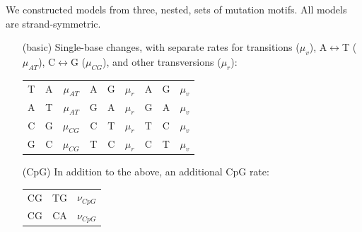 \documentclass{article}
\newcommand{\nA}{\mbox{A}}  %
\newcommand{\nC}{\mbox{C}}
\newcommand{\nG}{\mbox{G}}
\newcommand{\nT}{\mbox{T}}
\theoremstyle{plain}
\theoremstyle{definition}
\begin{document}
We constructed models from three, nested, sets of mutation motifs.
All models are strand-symmetric.
\begin{itemize}
    \item[(basic)]
        Single-base changes, with separate rates for transitions ($\mu_v$),
        \nA$\leftrightarrow$\nT{} ($\mu_{AT}$), \nC$\leftrightarrow$\nG{} ($\mu_{CG}$),
        and other transversions ($\mu_{r}$):
          \begin{center}
            \begin{tabular}{c@{\quad$\to$\quad}c@{\quad at rate\quad }c|c@{\quad$\to$\quad}c@{\quad at rate\quad }c|c@{\quad$\to$\quad}c@{\quad at rate\quad }c}
                \nT  &   \nA   &  $\mu_{AT}$ & \nA  &   \nG   &  $\mu_{r}$ & \nA  &   \nG   &  $\mu_{v}$ \\
                \nA  &   \nT   &  $\mu_{AT}$ & \nG  &   \nA   &  $\mu_{r}$ & \nG  &   \nA   &  $\mu_{v}$ \\
                \nC  &   \nG   &  $\mu_{CG}$ & \nC  &   \nT   &  $\mu_{r}$ & \nT  &   \nC   &  $\mu_{v}$ \\
                \nG  &   \nC   &  $\mu_{CG}$ & \nT  &   \nC   &  $\mu_{r}$ & \nC  &   \nT   &  $\mu_{v}$ \\
            \end{tabular}
          \end{center}

      \item[(CpG)] In addition to the above, an additional CpG rate:
          \begin{center}
            \begin{tabular}{c@{\quad$\to$\quad}c@{\quad at rate\quad }c}
                CG  &   TG   &  $\nu_{CpG}$ \\
                CG  &   CA   &  $\nu_{CpG}$ \\
            \end{tabular}
          \end{center}


\end{itemize}
\end{document}

